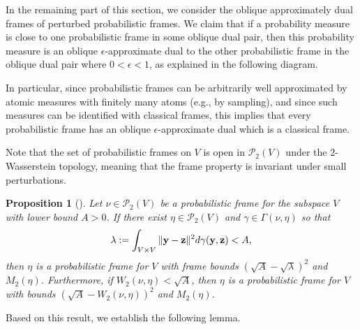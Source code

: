 \documentclass{amsart}
\numberwithin{equation}{section}
\theoremstyle{plain}
\newtheorem{proposition}[theorem]{Proposition}
\theoremstyle{remark}
\theoremstyle{definition}
\begin{document}
In the remaining part of this section, we consider the oblique approximately dual frames of perturbed probabilistic frames. We claim that if a probability measure is close to one probabilistic frame in some oblique dual pair, then this probability measure  is an oblique $\epsilon$-approximate dual to the other probabilistic frame in the oblique dual pair where $0<\epsilon <1$, as explained in the following diagram.
\begin{center}
\end{center}



In particular, since probabilistic frames can be arbitrarily well approximated by atomic measures with finitely many atoms (e.g., by sampling), and since such measures can be identified with classical frames, this implies that every probabilistic frame has an oblique $\epsilon$-approximate dual which is a classical frame.

Note that the set of probabilistic frames on $V$ is open in $\mathcal{P}_2(V)$ under the $2$-Wasserstein topology, meaning that the frame property is invariant under small perturbations.

\begin{proposition}[{\cite[Proposition 1.2, Corollary 1.3]{chen2023paley}}]\label{prop:quadratic closeness}
    Let $\nu \in \mathcal{P}_2(V)$ be a probabilistic frame for the subspace $V$ with lower  bound $A > 0$. If there exist $\eta \in \mathcal{P}_2(V)$  and $\gamma \in \Gamma(\nu, \eta) $ so that 
$$\lambda:=  \int_{V \times V} \| {\bf y}- {\bf z} \|^2 d\gamma({\bf y},{\bf z})  < A,$$
then $\eta$ is  a probabilistic frame for $V$ with frame bounds $(\sqrt{A}-\sqrt{\lambda})^2 $ and $M_2(\eta)$. Furthermore, if $W_2(\nu, \eta) < \sqrt{A}$,
then $\eta$ is a probabilistic frame for $V$ with bounds $(\sqrt{A}-W_2(\nu, \eta))^2 $ and $M_2(\eta)$.
\end{proposition}

Based on this result, we establish the following lemma.  
\end{document}

